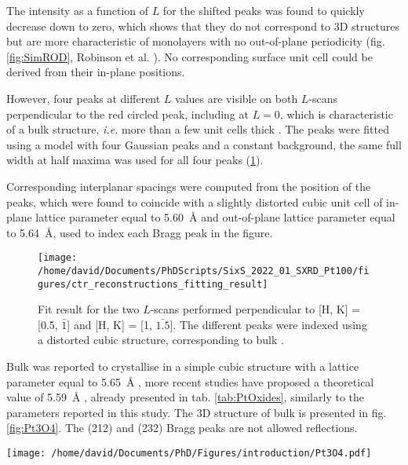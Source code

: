 The intensity as a function of $L$ for the shifted peaks was found to quickly decrease down to zero, which shows that they do not correspond to 3D structures but are more characteristic of monolayers with no out-of-plane periodicity (fig. \ref{fig:SimROD}, Robinson et al. \cite*{Robinson1991}).
No corresponding surface unit cell could be derived from their in-plane positions.

However, four peaks at different $L$ values are visible on both $L$-scans perpendicular to the red circled peak, including at $L=0$, which is characteristic of a bulk structure, \textit{i.e.} more than a few unit cells thick \parencite{Robinson1991}.
The peaks were fitted using a model with four Gaussian peaks and a constant background, the same full width at half maxima was used for all four peaks (\ref{fig:FitPt100LScans}).

Corresponding interplanar spacings were computed from the position of the peaks, which were found to coincide with a slightly distorted cubic unit cell of in-plane lattice parameter equal to \qty{5.60}{\angstrom} and out-of-plane lattice parameter equal to \qty{5.64}{\angstrom}, used to index each Bragg peak in the figure.

\begin{figure}[!htb]
    \centering
    \texttt{[image: /home/david/Documents/PhDScripts/SixS\_2022\_01\_SXRD\_Pt100/figures/ctr\_reconstructions\_fitting\_result]}
    \caption{
        Fit result for the two $L$-scans performed perpendicular to [H, K] = [0.5, $\bar{1}$] and [H, K] = [1, $\bar{1.5}$].
        The different peaks were indexed using a distorted cubic structure, corresponding to bulk .
    }
    \label{fig:FitPt100LScans}
\end{figure}

Bulk  was reported to crystallise in a simple cubic structure with a lattice parameter equal to \qty{5.65}{\angstrom} \parencite{Galloni1941, Galloni1952, Muller1968}, more recent studies have proposed a theoretical value of \qty{5.59}{\angstrom} \parencite{Seriani2006}, already presented in tab. \ref{tab:PtOxides}, similarly to the parameters reported in this study.
The 3D structure of bulk  is presented in fig. \ref{fig:Pt3O4}.
The (212) and (232) Bragg peaks are not allowed reflections.

\begin{SCfigure}
    \centering
    \texttt{[image: /home/david/Documents/PhD/Figures/introduction/Pt3O4.pdf]}
    \caption{
         bulk unit cell.
        Platinum atoms are situated on the faces on the cubic unit cell (e.g. $(0, 1/2, 1/4)$, $(0, 1/2, 3/4)$), while the eight oxygen atoms are inside the unit cell at the positions $(1/4, 1/4, z)$, $(1/4, 2/4, z)$, $(2/4, 1/4, z)$, $(2/4, 2/4, z)$ for $z=1/4$ and $z=3/4$.
    }
    \label{fig:Pt3O4}
\end{SCfigure}

